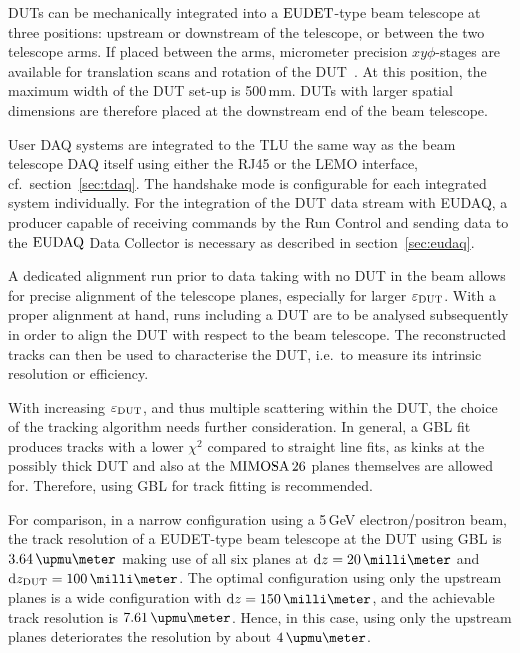 DUTs can be mechanically integrated into a $\textrm{EUDET}$-type beam telescope at three positions: upstream or downstream of the telescope, or between the two telescope arms.
If placed between the arms, micrometer precision $xy\phi$-stages are available for translation scans and rotation of the DUT~\cite{Mimosa-twiki}.
At this position, the maximum width of the DUT set-up is 500\,mm.
DUTs with larger spatial dimensions are therefore placed at the downstream end of the beam telescope. 

User DAQ systems are integrated to the TLU the same way as the beam telescope DAQ itself using either the RJ45 or the LEMO interface, cf.~section~\ref{sec:tdaq}.
The handshake mode is configurable for each integrated system individually. 
For the integration of the DUT data stream with EUDAQ, a producer capable of receiving commands by the Run Control and sending data to the $\textrm{EUDAQ}$ Data Collector is necessary
 as described in section~\ref{sec:eudaq}.

A dedicated alignment run prior to data taking with no DUT in the beam allows for precise alignment of the telescope planes, especially for larger $\mathnormal{\varepsilon_{\textrm{DUT}}}$. 
With a proper alignment at hand, runs including a DUT are to be analysed subsequently in order to align the DUT with respect to the beam telescope. 
The reconstructed tracks can then be used to characterise the DUT, i.e.~to measure its intrinsic resolution or efficiency. 

With increasing $\mathnormal{\varepsilon_{\textrm{DUT}}}$, and thus multiple scattering within the DUT, the choice of the tracking algorithm needs further consideration. 
In general, a GBL fit produces tracks with a lower $\chi^2$ compared to straight line fits,
 as kinks at the possibly thick DUT and also at the $\textrm{MIMOSA\,26}$ planes themselves are allowed for.
Therefore, using GBL for track fitting is recommended. 

For comparison, in a narrow configuration using a 5\,GeV electron/positron beam,
 the track resolution of a EUDET-type beam telescope at the DUT using GBL is $3.64\,\upmu\meter$ making use of all six planes at $\dz = 20\,\milli\meter$ and $\dzdut = 100\,\milli\meter$.
The optimal configuration using only the upstream planes is a wide configuration with $\dz = 150\,\milli\meter$,
 and the achievable track resolution is $7.61\,\upmu\meter$. 
Hence, in this case, using only the upstream planes deteriorates the resolution by about $4\,\upmu\meter$.
